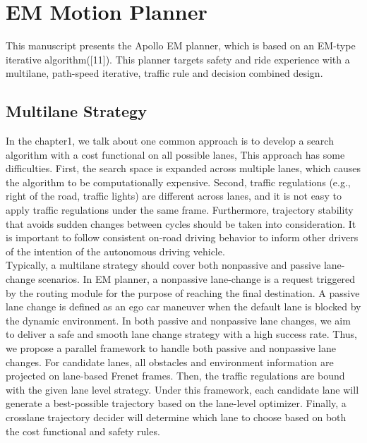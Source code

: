 \documentclass{report}
\begin{document}
 
 \chapter{EM Motion Planner}
 This manuscript presents the Apollo EM planner, which is based on an EM-type iterative algorithm([11]). This planner targets safety and ride experience with a multilane, path-speed iterative, traffic rule and decision combined design.
 \section{Multilane Strategy}
 In the chapter1, we talk about one common approach is to develop a search algorithm
 with a cost functional on all possible lanes, This approach has some difficulties. First, the search space is expanded across multiple lanes, which causes the algorithm to be computationally expensive. Second, traffic regulations (e.g., right of the road, traffic lights) are different across lanes, and it is not easy to apply traffic regulations under the same frame. Furthermore, trajectory stability that avoids sudden changes between cycles should be taken into consideration. It is important to follow consistent on-road driving behavior to inform other drivers of the intention of the autonomous driving vehicle.\\
 \indent
 Typically, a multilane strategy should cover both nonpassive and passive lane-change scenarios. In EM planner, a nonpassive lane-change is a request triggered by the routing module for the purpose of reaching the final destination. A passive lane change is defined as an ego car maneuver when the default lane is blocked by the dynamic environment. In both passive and nonpassive lane changes, we aim to deliver a safe and smooth lane change strategy with a high success rate.
 Thus, we propose a parallel framework to handle both passive and nonpassive lane changes. For candidate lanes, all obstacles and environment information are projected on lane-based Frenet frames. Then, the traffic regulations are bound with the given lane level strategy. Under this framework, each candidate lane will generate a best-possible trajectory based on the lane-level optimizer. Finally, a crosslane trajectory decider will determine which lane to choose based on both the cost functional and safety rules.
\end{document}
